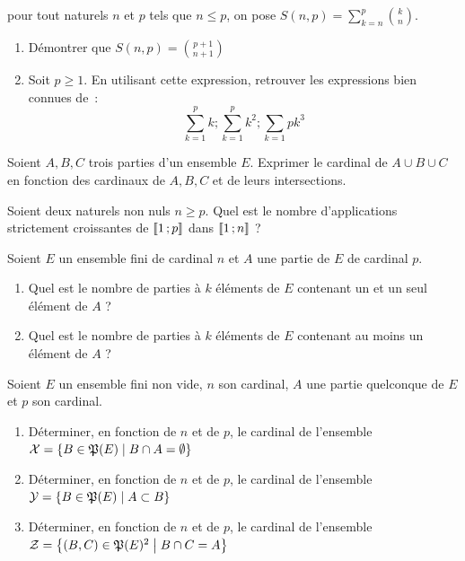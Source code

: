 \begin{exercice}
  pour tout naturels \(n\) et \(p\) tels que \(n \leqslant p\), on pose 
  \(S(n, p) = \sum_{k = n}^p \binom{k}{n}\).
  \begin{enumerate}
    \item Démontrer que \(S(n, p) = \binom{p + 1}{n + 1}\)
    \item Soit \(p \geqslant 1\). En utilisant cette expression, retrouver les 
      expressions bien connues de~:\[\sum_{k = 1}^p k ; \sum_{k = 1}^p k^2 ; 
      \sum_{k = 1}{p} k^3\]
  \end{enumerate}
\end{exercice}

\begin{exercice}
  Soient \(A, B, C\) trois parties d'un ensemble \(E\). Exprimer le cardinal 
  de \(A \cup B \cup C\) en fonction des cardinaux de \(A, B, C\) et de leurs 
  intersections.
\end{exercice}

\begin{exercice}
  Soient deux naturels non nuls \(n\geqslant p\). Quel est le nombre 
  d'applications strictement croissantes de \(\mathopen{\llbracket}1\mathclose{}\mathpunct{};p\mathclose{\rrbracket}\) dans 
  \(\mathopen{\llbracket}1\mathclose{}\mathpunct{};n\mathclose{\rrbracket}\) ?
\end{exercice}

\begin{exercice}
  Soient \(E\) un ensemble fini de cardinal \(n\) et \(A\) une partie de \(E\) 
  de cardinal \(p\).
  \begin{enumerate}
    \item Quel est le nombre de parties à \(k\) éléments de \(E\) contenant un 
      et un seul élément de \(A\) ?
    \item Quel est le nombre de parties à \(k\) éléments de \(E\) contenant au 
      moins un  élément de \(A\) ?
  \end{enumerate}
\end{exercice}

\begin{exercice}
  Soient \(E\) un ensemble fini non vide, \(n\) son cardinal, \(A\) une partie 
  quelconque de \(E\) et \(p\) son cardinal.
  \begin{enumerate}
    \item Déterminer, en fonction de \(n\) et de \(p\), le cardinal de 
      l'ensemble \(\mathcal{X} = \left\{B \in \mathfrak{P}(E)\mathrel{}\middle|\mathrel{}B \cap A = 
      \emptyset\right\}\)
    \item Déterminer, en fonction de \(n\) et de \(p\), le cardinal de 
      l'ensemble \(\mathcal{Y} = \left\{B \in \mathfrak{P}(E)\mathrel{}\middle|\mathrel{}A \subset B\right\}\)
    \item Déterminer, en fonction de \(n\) et de \(p\), le cardinal de 
      l'ensemble \(\mathcal{Z} = \left\{(B, C) \in \mathfrak{P}(E)^2\mathrel{}\middle|\mathrel{}B \cap C = A\right\}\)
  \end{enumerate}
\end{exercice}
